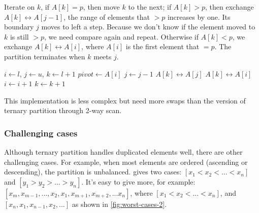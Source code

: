 \documentclass[b5paper]{article}
\begin{document}
Iterate on $k$, if $A[k] = p$, then move $k$ to the next; if $A[k] > p$, then exchange $A[k] \leftrightarrow A[j-1]$, the range of elements that $> p$ increases by one. Its boundary $j$ moves to left a step. Because we don't know if the element moved to $k$ is still $> p$, we need compare again and repeat. Otherwise if $A[k] < p$, we exchange $A[k] \leftrightarrow A[i]$, where $A[i]$ is the first element that $= p$. The partition terminates when $k$ meets $j$.

\begin{algorithmic}[1]
    \State $i \gets l$, $j \gets u$, $k \gets l + 1$
    \State $pivot \gets A[i]$
        \State $j \gets j - 1$
        \State {} $A[k] \leftrightarrow A[j]$
      \EndWhile
        \State {} $A[k] \leftrightarrow A[i]$
        \State $i \gets i + 1$
      \EndIf
      \State $k \gets k + 1$
    \EndWhile
    \State {}
    \State {}
  \EndIf
\EndProcedure
\end{algorithmic}

This implementation is less complex but need more swaps than the version of ternary partition through 2-way scan.

\subsubsection{Challenging cases}

Although ternary partition handles duplicated elements well, there are other challenging cases. For example, when most elements are ordered (ascending or descending), the partition is unbalanced.  gives two cases: $[x_1 < x_2 < ... < x_n]$ and $[y_1 > y_2 > ... > y_n]$. It's easy to give more, for example: $[x_m, x_{m-1}, ..., x_2, x_1, x_{m+1}, x_{m+2}, ... x_n]$, where $[ x_1 < x_2 < ... < x_n]$, and $[x_n, x_1, x_{n-1}, x_2, ... ]$ as shown in \cref{fig:worst-cases-2}.
\end{document}
